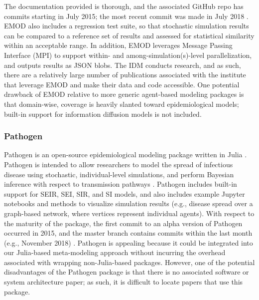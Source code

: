 \documentclass{article}
\begin{document}
The documentation provided is thorough, and the associated GitHub repo has commits starting in July 2015; the most recent commit was made in July 2018 \cite{emodRepo, emodDocs}. EMOD also includes a regression test suite, so that stochastic simulation results can be compared to a reference set of results and assessed for statistical similarity within an acceptable range. In addition, EMOD leverages Message Passing Interface (MPI) to support within- and among-simulation(s)-level parallelization, and outputs results as JSON blobs. The IDM conducts research, and as such, there are a relatively large number of publications associated with the institute that leverage EMOD and make their data and code accessible. One potential drawback of EMOD relative to more generic agent-based modeling packages is that domain-wise, coverage is heavily slanted toward epidemiological models; built-in support for information diffusion models is not included. 

\subsubsection{Pathogen}
Pathogen is an open-source epidemiological modeling package written in Julia \cite{pathogenRepo}. Pathogen is intended to allow researchers to model the spread of infectious disease using stochastic, individual-level simulations, and perform Bayesian inference with respect to transmission pathways \cite{pathogenRepo}. Pathogen includes built-in support for SEIR, SEI, SIR, and SI models, and also includes example Jupyter notebooks and methods to visualize simulation results (e.g., disease spread over a graph-based network, where vertices represent individual agents). With respect to the maturity of the package, the first commit to an alpha version of Pathogen occurred in 2015, and the master branch contains commits within the last month (e.g., November 2018) \cite{pathogenRepo}. Pathogen is appealing because it could be integrated into our Julia-based meta-modeling approach without incurring the overhead associated with wrapping non-Julia-based packages. However, one of the potential disadvantages of the Pathogen package is that there is no associated software or system architecture paper; as such, it is difficult to locate papers that use this package. 

\end{document}
